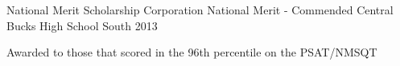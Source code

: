 \begin{cventries}
  \cventry
    {National Merit Scholarship Corporation} %
    {National Merit - Commended} %
    {Central Bucks High School South} %
    {2013} %
    {
      \begin{cvitems} %
        \item {Awarded to those that scored in the 96th percentile on the PSAT/NMSQT}
      \end{cvitems}
    }

  \vspace{-6mm}

\end{cventries}